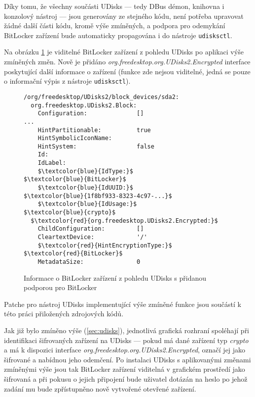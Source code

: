 Díky tomu, že všechny součásti UDisks --- tedy DBus démon, knihovna i konzolový nástroj --- jsou generovány ze stejného kódu, není potřeba upravovat žádné další části kódu, kromě výše zmíněných, a podpora pro odemykání BitLocker zařízení bude automaticky propagována i do nástroje \texttt{udisksctl}.

Na obrázku \ref{fig:udisks-bitlocker-with-support} je viditelné BitLocker zařízení z pohledu UDisks po aplikaci výše zmíněných změn. Nově je přidáno \emph{org.freedesktop.org.UDisks2.Encrypted} interface poskytující další informace o zařízení (funkce zde nejsou viditelné, jedná se pouze o informační výpis z nástroje \texttt{udisksctl}).

\begin{figure}[h]
		\centering
		\captionsetup{width=0.65\linewidth}
\begin{center}
\centering
\begin{lstlisting}[frame=none, escapechar=$, basicstyle=\ttfamily\small, columns=fullflexible, keepspaces=true, xleftmargin=.2\textwidth, xrightmargin=.2\textwidth]
/org/freedesktop/UDisks2/block_devices/sda2:
  org.freedesktop.UDisks2.Block:
    Configuration:              []
...
    HintPartitionable:          true
    HintSymbolicIconName:
    HintSystem:                 false
    Id:
    IdLabel:
    $\textcolor{blue}{IdType:}$                     $\textcolor{blue}{BitLocker}$
    $\textcolor{blue}{IdUUID:}$                     $\textcolor{blue}{1f8bf933-8323-4c97-...}$
    $\textcolor{blue}{IdUsage:}$                    $\textcolor{blue}{crypto}$
  $\textcolor{red}{org.freedesktop.UDisks2.Encrypted:}$
    ChildConfiguration:         []
    CleartextDevice:            '/'
    $\textcolor{red}{HintEncryptionType:}$          $\textcolor{red}{BitLocker}$
    MetadataSize:               0

\end{lstlisting}
\end{center}
		\caption{Informace o BitLocker zařízení z pohledu UDisks s přidanou podporou pro BitLocker}
		\label{fig:udisks-bitlocker-with-support}
\end{figure}

Patche pro nástroj UDisks implementující výše zmíněné funkce jsou součástí k této práci přiložených zdrojových kódů.


Jak již bylo zmíněno výše (\ref{sec:udisks}), jednotlivá grafická rozhraní spoléhají při identifikaci šifrovaných zařízení na UDisks --- pokud má dané zařízení typ \emph{crypto} a má k dispozici interface \emph{org.freedesktop.org.UDisks2.Encrypted}, označí jej jako šifrované a nabídnou jeho odemčení. Po instalaci UDisks s aplikovanými změnami zmíněnými výše jsou tak BitLocker zařízení viditelná v grafickém prostředí jako šifrovaná a při pokusu o jejich připojení bude uživatel dotázán na heslo po jehož zadání mu bude zpřístupněno nově vytvořené otevřené zařízení.

